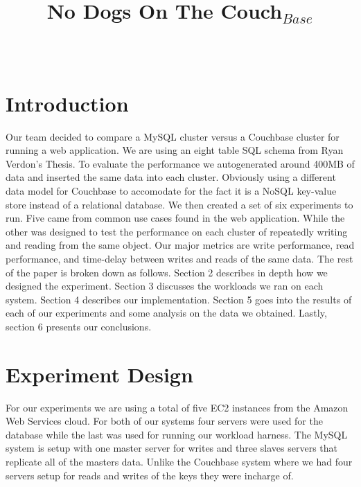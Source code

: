 \documentclass[]{IEEEtran}
\begin{document}
\title{No Dogs On The Couch$_{Base}$}


\author{
\\
}

\maketitle

\thispagestyle{empty}
\pagestyle{empty}

\section{Introduction}
Our team decided to compare a MySQL cluster versus a Couchbase cluster for running a
web application. We are using an eight table SQL schema from Ryan Verdon's Thesis. To evaluate
the performance we autogenerated around 400MB of data and inserted the same data into each cluster.
Obviously using a different data model for Couchbase to accomodate for the fact it is a NoSQL key-value store
instead of a relational database. We then created a set of six experiments to run. Five came from common 
use cases found in the web application. While the other was designed to test the performance on each cluster
of repeatedly writing and reading from the same object. Our major metrics are write performance, read performance,
and time-delay between writes and reads of the same data. The rest of the paper is broken down as follows.
Section 2 describes in depth how we designed the experiment. Section 3 discusses the workloads we ran on each system. Section 4 describes our implementation. Section 5 goes
into the results of each of our experiments and some analysis on the data we obtained. Lastly, section 6 presents 
our conclusions.

\section{Experiment Design}
For our experiments we are using a total of five EC2 instances from the Amazon Web Services cloud. For both of our systems four servers were used for the database while the last was used for running our workload harness. The MySQL system is setup with one master server for writes and three slaves servers that replicate all of the masters data. Unlike the Couchbase system where we had four servers setup for reads and writes of the keys they were incharge of.
\end{document}
